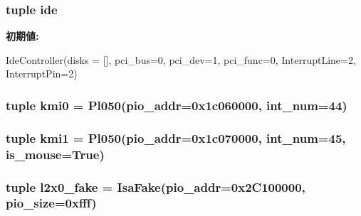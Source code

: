 \label{classRealView_1_1VExpress__EMM_a8848fedc605f9c4448e17b5833175525}
\hypertarget{classRealView_1_1VExpress__EMM_aca6e0ef87c4d6a0425503849acb9d173}{
\subsubsection[{ide}]{\setlength{\rightskip}{0pt plus 5cm}tuple {\bf ide}}}
\label{classRealView_1_1VExpress__EMM_aca6e0ef87c4d6a0425503849acb9d173}
{\bfseries 初期値:}
\begin{DoxyCode}
IdeController(disks = [], pci_bus=0, pci_dev=1, pci_func=0,
                        InterruptLine=2, InterruptPin=2)
\end{DoxyCode}
\hypertarget{classRealView_1_1VExpress__EMM_a4fcef88eafab200d46609dff412add24}{
\subsubsection[{kmi0}]{\setlength{\rightskip}{0pt plus 5cm}tuple {\bf kmi0} = {\bf Pl050}(pio\_\-addr=0x1c060000, int\_\-num=44)}}
\label{classRealView_1_1VExpress__EMM_a4fcef88eafab200d46609dff412add24}
\hypertarget{classRealView_1_1VExpress__EMM_ad2ff68a98564bfc794ffe30ecd80da6c}{
\subsubsection[{kmi1}]{\setlength{\rightskip}{0pt plus 5cm}tuple {\bf kmi1} = {\bf Pl050}(pio\_\-addr=0x1c070000, int\_\-num=45, is\_\-mouse=True)}}
\label{classRealView_1_1VExpress__EMM_ad2ff68a98564bfc794ffe30ecd80da6c}
\hypertarget{classRealView_1_1VExpress__EMM_a58c42fcf23ff778110e667e2df1fbb6f}{
\subsubsection[{l2x0\_\-fake}]{\setlength{\rightskip}{0pt plus 5cm}tuple {\bf l2x0\_\-fake} = {\bf IsaFake}(pio\_\-addr=0x2C100000, pio\_\-size=0xfff)}}
